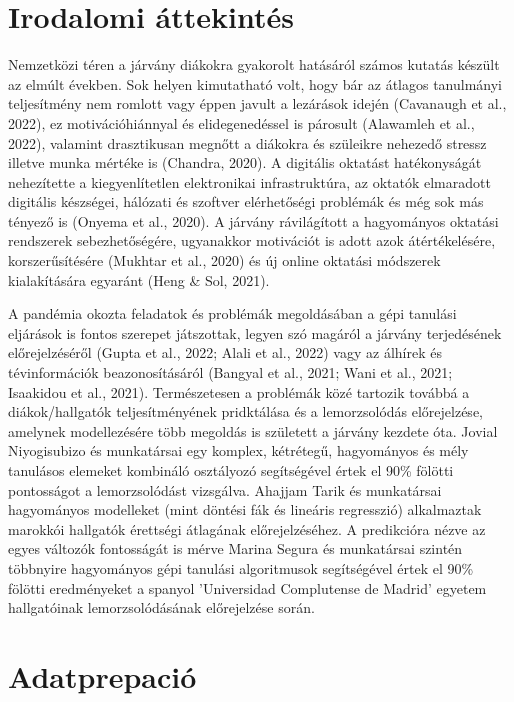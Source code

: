 \documentclass[12pt]{article}
\begin{document}
\newpage

\section{Irodalomi áttekintés}

Nemzetközi téren a járvány diákokra gyakorolt hatásáról számos kutatás készült az elmúlt években. Sok helyen kimutatható volt, hogy bár az átlagos tanulmányi teljesítmény nem romlott vagy éppen javult a lezárások idején (Cavanaugh et al., 2022), ez motivációhiánnyal és elidegenedéssel is párosult (Alawamleh et al., 2022), valamint drasztikusan megnőtt a diákokra és szüleikre nehezedő stressz illetve munka mértéke is (Chandra, 2020). A digitális oktatást hatékonyságát nehezítette a kiegyenlítetlen elektronikai infrastruktúra, az oktatók elmaradott digitális készségei, hálózati és szoftver elérhetőségi problémák és még sok más tényező is (Onyema et al., 2020). A járvány rávilágított a hagyományos oktatási rendszerek sebezhetőségére, ugyanakkor motivációt is adott azok átértékelésére, korszerűsítésére (Mukhtar et al., 2020) és új online oktatási módszerek kialakítására egyaránt (Heng \& Sol, 2021).

A pandémia okozta feladatok és problémák megoldásában a gépi tanulási eljárások is fontos szerepet játszottak, legyen szó magáról a járvány terjedésének előrejelzéséről (Gupta et al., 2022; Alali et al., 2022) vagy az álhírek és tévinformációk beazonosításáról (Bangyal et al., 2021; Wani et al., 2021; Isaakidou et al., 2021). Természetesen a problémák közé tartozik továbbá a diákok/hallgatók teljesítményének pridktálása és a lemorzsolódás előrejelzése, amelynek modellezésére több megoldás is született a járvány kezdete óta. Jovial Niyogisubizo és munkatársai \cite{modeling1} egy komplex, kétrétegű, hagyományos és mély tanulásos elemeket kombináló osztályozó segítségével értek el 90\% fölötti pontosságot a lemorzsolódást vizsgálva. Ahajjam Tarik és munkatársai \cite{modeling3} hagyományos modelleket (mint döntési fák és lineáris regresszió) alkalmaztak marokkói hallgatók érettségi átlagának előrejelzéséhez. A predikcióra nézve az egyes változók fontosságát is mérve Marina Segura és munkatársai \cite{modeling2} szintén többnyire hagyományos gépi tanulási algoritmusok segítségével értek el 90\% fölötti eredményeket a spanyol 'Universidad Complutense de Madrid' egyetem hallgatóinak lemorzsolódásának előrejelzése során.

\newpage

\section{Adatprepació}
\end{document}
